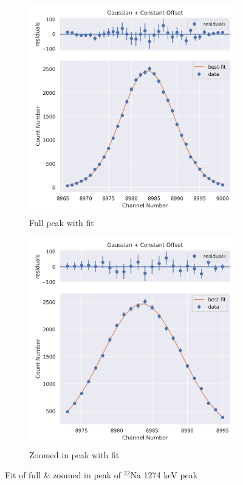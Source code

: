 \documentclass[11pt,a4paper]{article}
\newcommand{\element}[2]{$^{#2}\textrm{#1}$}
\begin{document}
\begin{figure}[H]
  \centering
  \begin{subfigure}{.5\linewidth}
    \centering
    \includegraphics[width=\linewidth]{./Images/Sodium22/Gauss/Gauss_2_Full.png}
    \caption{Full peak with fit}
  \end{subfigure} 
  \begin{subfigure}{.5\linewidth}
    \centering
    \includegraphics[width=\linewidth]{./Images/Sodium22/Gauss/Gauss_2_Zoom.png}
    \caption{Zoomed in peak with fit}
  \end{subfigure}
  \caption{Fit of full \& zoomed in peak of \element{Na}{22} 1274 keV peak}
\end{figure}
\clearpage
\end{document}
